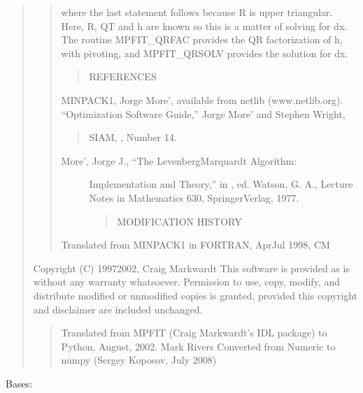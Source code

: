 \documentclass[letterpaper,10pt,english]{sphinxmanual}
\begin{document}
\begin{quote}
\begin{quote}
where the last statement follows because R is upper triangular.
Here, R, QT and h are known so this is a matter of solving for dx.
The routine MPFIT\_QRFAC provides the QR factorization of h, with
pivoting, and MPFIT\_QRSOLV provides the solution for dx.
\begin{quote}

REFERENCES
\end{quote}

MINPACK\sphinxhyphen{}1, Jorge More’, available from netlib (www.netlib.org).
“Optimization Software Guide,” Jorge More’ and Stephen Wright,
\begin{quote}

SIAM, , Number 14.
\end{quote}
\begin{description}
\item[{More’, Jorge J., “The Levenberg\sphinxhyphen{}Marquardt Algorithm:}] \leavevmode
Implementation and Theory,” in , ed. Watson,
G. A., Lecture Notes in Mathematics 630, Springer\sphinxhyphen{}Verlag, 1977.
\begin{quote}

MODIFICATION HISTORY
\end{quote}

\end{description}

Translated from MINPACK\sphinxhyphen{}1 in FORTRAN, Apr\sphinxhyphen{}Jul 1998, CM
\end{quote}

Copyright (C) 1997\sphinxhyphen{}2002, Craig Markwardt
This software is provided as is without any warranty whatsoever.
Permission to use, copy, modify, and distribute modified or
unmodified copies is granted, provided this copyright and disclaimer
are included unchanged.
\begin{quote}

Translated from MPFIT (Craig Markwardt’s IDL package) to Python,
August, 2002.  Mark Rivers
Converted from Numeric to numpy (Sergey Koposov, July 2008)
\end{quote}
\end{quote}

\begin{fulllineitems}
\label{\detokenize{index:FASMA.mpfit.machar}}
Bases: 

\end{fulllineitems}
\end{document}
